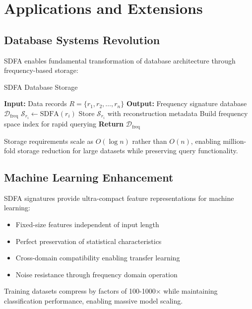 \documentclass[10pt,journal,compsoc]{IEEEtran}
\newcommand{\sdfa}{\textsc{SDFA}}
\newcommand{\sig}[1]{\mathcal{S}_{#1}}
\begin{document}
\section{Applications and Extensions}

\subsection{Database Systems Revolution}

\sdfa{} enables fundamental transformation of database architecture through frequency-based storage:

\begin{algorithm}[t]
\caption{SDFA Database Storage}
\begin{algorithmic}[1]
\STATE \textbf{Input:} Data records $R = \{r_1, r_2, \ldots, r_n\}$
\STATE \textbf{Output:} Frequency signature database $\mathcal{D}_{\text{freq}}$
    \STATE $\sig{r_i} \leftarrow \text{SDFA}(r_i)$
    \STATE Store $\sig{r_i}$ with reconstruction metadata
\ENDFOR
\STATE Build frequency space index for rapid querying
\STATE \textbf{Return} $\mathcal{D}_{\text{freq}}$
\end{algorithmic}
\end{algorithm}

Storage requirements scale as $O(\log n)$ rather than $O(n)$, enabling million-fold storage reduction for large datasets while preserving query functionality.

\subsection{Machine Learning Enhancement}

\sdfa{} signatures provide ultra-compact feature representations for machine learning:

\begin{itemize}
\item Fixed-size features independent of input length
\item Perfect preservation of statistical characteristics
\item Cross-domain compatibility enabling transfer learning
\item Noise resistance through frequency domain operation
\end{itemize}

Training datasets compress by factors of 100-1000× while maintaining classification performance, enabling massive model scaling.
\end{document}
